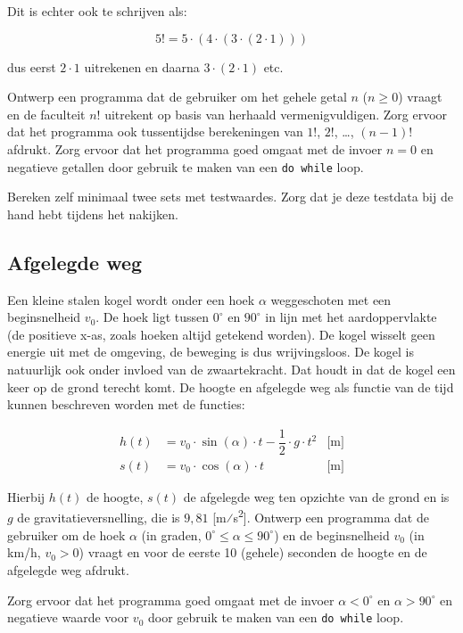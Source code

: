 \documentclass[a4paper,10pt,fleqn,twoside]{article}
\begin{document}
Dit is echter ook te schrijven als:

\begin{equation*}
5! = 5\cdot(4\cdot(3\cdot(2\cdot1)))
\end{equation*}

dus eerst $2\cdot1$ uitrekenen en daarna $3\cdot(2\cdot1)$ etc.

Ontwerp een programma dat de gebruiker om het gehele getal $n$ ($n \geq 0$) vraagt en de faculteit $n!$ uitrekent op basis van herhaald vermenigvuldigen. Zorg ervoor dat het programma ook tussentijdse berekeningen van $1!$, $2!$, \ldots, $(n-1)!$ afdrukt. Zorg ervoor dat het programma goed omgaat met de invoer $n = 0$ en negatieve getallen door gebruik te maken van een \lstinline|do while| loop.

Bereken zelf minimaal twee sets met testwaardes. Zorg dat je deze testdata bij de hand hebt tijdens het nakijken.

\subsection{Afgelegde weg}
Een kleine stalen kogel wordt onder een hoek $\alpha$ weggeschoten met een beginsnelheid $v_0$. De hoek ligt tussen $0^\circ$ en $90^\circ$ in lijn met het aardoppervlakte (de positieve x-as, zoals hoeken altijd getekend worden). De kogel wisselt geen energie uit met de omgeving, de beweging is dus wrijvingsloos. De kogel is natuurlijk ook onder invloed van de zwaartekracht. Dat houdt in dat de kogel een keer op de grond terecht komt. De hoogte en afgelegde weg als functie van de tijd kunnen beschreven worden met de functies:

\begin{align*}
h(t) &= v_0\cdot \sin(\alpha)\cdot t - \dfrac{1}{2}\cdot g\cdot t^2 & \text{[m]} \\
s(t) &= v_0\cdot \cos(\alpha)\cdot t & \text{[m]} 
\end{align*}

Hierbij $h(t)$ de hoogte, $s(t)$ de afgelegde weg ten opzichte van de grond en is $g$ de gravitatieversnelling, die is $9,81$ [m⁄s\textsuperscript{2}]. Ontwerp een programma dat de gebruiker om de hoek $\alpha$ (in graden, $0^\circ \leq \alpha \leq 90^\circ$) en de beginsnelheid $v_0$ (in km/h, $v_0 > 0$) vraagt en voor de eerste 10 (gehele) seconden de hoogte en de afgelegde weg afdrukt.

Zorg ervoor dat het programma goed omgaat met de invoer $\alpha < 0^\circ$ en $\alpha > 90^\circ$ en negatieve waarde voor $v_0$ door gebruik te maken van een \lstinline|do while| loop.
\end{document}
